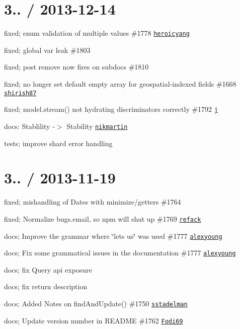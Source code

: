 \section*{3.. / 2013-\/12-\/14 }


\begin{DoxyItemize}
\item fixed; enum validation of multiple values \#1778 \href{https://github.com/heroicyang}{\tt heroicyang}
\item fixed; global var leak \#1803
\item fixed; post remove now fires on subdocs \#1810
\item fixed; no longer set default empty array for geospatial-\/indexed fields \#1668 \href{https://github.com/shirish87}{\tt shirish87}
\item fixed; model.\+stream() not hydrating discriminators correctly \#1792 \href{https://github.com/j}{\tt j}
\item docs\+: Stablility -\/$>$ Stability \href{https://github.com/nikmartin}{\tt nikmartin}
\item tests; improve shard error handling
\end{DoxyItemize}

\section*{3.. / 2013-\/11-\/19 }


\begin{DoxyItemize}
\item fixed; mishandling of Dates with minimize/getters \#1764
\item fixed; Normalize bugs.\+email, so {\ttfamily npm} will shut up \#1769 \href{https://github.com/refack}{\tt refack}
\item docs; Improve the grammar where \char`\"{}lets us\char`\"{} was used \#1777 \href{https://github.com/alexyoung}{\tt alexyoung}
\item docs; Fix some grammatical issues in the documentation \#1777 \href{https://github.com/alexyoung}{\tt alexyoung}
\item docs; fix Query api exposure
\item docs; fix return description
\item docs; Added Notes on find\+And\+Update() \#1750 \href{https://github.com/sstadelman}{\tt sstadelman}
\item docs; Update version number in R\+E\+A\+D\+ME \#1762 \href{https://github.com/Fodi69}{\tt Fodi69}
\end{DoxyItemize}


